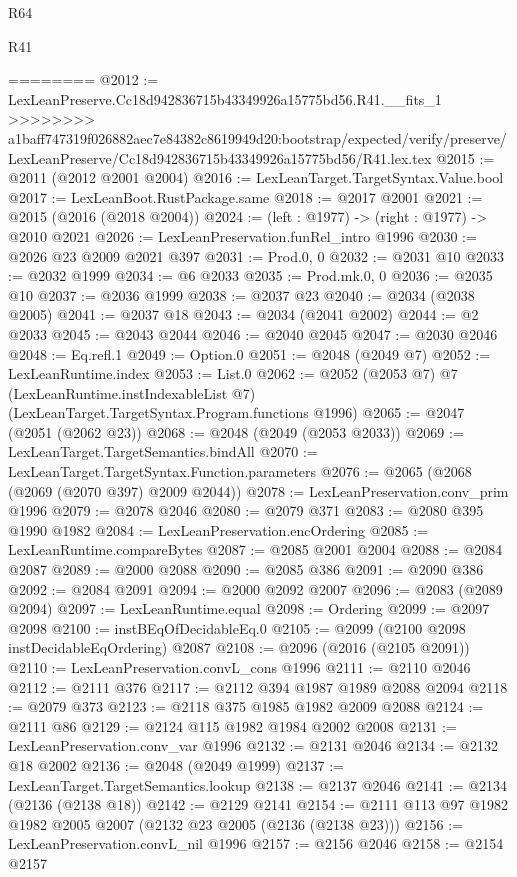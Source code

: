 \begin{lexlean}{R64}
\begin{lexlean}{R41}
\begin{coremodule}
{{{{{{{{{{{{{{{{{{{{{{{{{{{{{{{{{{{{{{{{{{{{{{{{{{{{{{{{{{{{{{{{{{{{{{{{{{{{{{{{{{{{{{{{{========
@2012 := LexLeanPreserve.Cc18d942836715b43349926a15775bd56.R41.__fits_1
>>>>>>>> a1baff747319f026882aec7e84382c8619949d20:bootstrap/expected/verify/preserve/LexLeanPreserve/Cc18d942836715b43349926a15775bd56/R41.lex.tex
@2015 := @2011 (@2012 @2001 @2004)
@2016 := LexLeanTarget.TargetSyntax.Value.bool
@2017 := LexLeanBoot.RustPackage.same
@2018 := @2017 @2001
@2021 := @2015 (@2016 (@2018 @2004))
@2024 := (left : @1977) -> (right : @1977) -> @2010 @2021
@2026 := LexLeanPreservation.funRel_intro @1996
@2030 := @2026 @23 @2009 @2021 @397
@2031 := Prod.{0, 0}
@2032 := @2031 @10
@2033 := @2032 @1999
@2034 := @6 @2033
@2035 := Prod.mk.{0, 0}
@2036 := @2035 @10
@2037 := @2036 @1999
@2038 := @2037 @23
@2040 := @2034 (@2038 @2005)
@2041 := @2037 @18
@2043 := @2034 (@2041 @2002)
@2044 := @2 @2033
@2045 := @2043 @2044
@2046 := @2040 @2045
@2047 := @2030 @2046
@2048 := Eq.refl.{1}
@2049 := Option.{0}
@2051 := @2048 (@2049 @7)
@2052 := LexLeanRuntime.index
@2053 := List.{0}
@2062 := @2052
    (@2053 @7)
    @7
    (LexLeanRuntime.instIndexableList @7)
    (LexLeanTarget.TargetSyntax.Program.functions @1996)
@2065 := @2047 (@2051 (@2062 @23))
@2068 := @2048 (@2049 (@2053 @2033))
@2069 := LexLeanTarget.TargetSemantics.bindAll
@2070 := LexLeanTarget.TargetSyntax.Function.parameters
@2076 := @2065 (@2068 (@2069 (@2070 @397) @2009 @2044))
@2078 := LexLeanPreservation.conv_prim @1996
@2079 := @2078 @2046
@2080 := @2079 @371
@2083 := @2080 @395 @1990 @1982
@2084 := LexLeanPreservation.encOrdering
@2085 := LexLeanRuntime.compareBytes
@2087 := @2085 @2001 @2004
@2088 := @2084 @2087
@2089 := @2000 @2088
@2090 := @2085 @386
@2091 := @2090 @386
@2092 := @2084 @2091
@2094 := @2000 @2092 @2007
@2096 := @2083 (@2089 @2094)
@2097 := LexLeanRuntime.equal
@2098 := Ordering
@2099 := @2097 @2098
@2100 := instBEqOfDecidableEq.{0}
@2105 := @2099 (@2100 @2098 instDecidableEqOrdering) @2087
@2108 := @2096 (@2016 (@2105 @2091))
@2110 := LexLeanPreservation.convL_cons @1996
@2111 := @2110 @2046
@2112 := @2111 @376
@2117 := @2112 @394 @1987 @1989 @2088 @2094
@2118 := @2079 @373
@2123 := @2118 @375 @1985 @1982 @2009 @2088
@2124 := @2111 @86
@2129 := @2124 @115 @1982 @1984 @2002 @2008
@2131 := LexLeanPreservation.conv_var @1996
@2132 := @2131 @2046
@2134 := @2132 @18 @2002
@2136 := @2048 (@2049 @1999)
@2137 := LexLeanTarget.TargetSemantics.lookup
@2138 := @2137 @2046
@2141 := @2134 (@2136 (@2138 @18))
@2142 := @2129 @2141
@2154 := @2111 @113 @97 @1982 @1982 @2005 @2007 (@2132 @23 @2005 (@2136 (@2138 @23)))
@2156 := LexLeanPreservation.convL_nil @1996
@2157 := @2156 @2046
@2158 := @2154 @2157
}}}}}}}}}}}}}}}}}}}}}}}}}}}}}}}}}}}}}}}}}}}}}}}}}}}}}}}}}}}}}}}}}}}}}}}}}}}}}}}}}}}}}}}}}
\end{coremodule}
\end{lexlean}
\end{lexlean}
